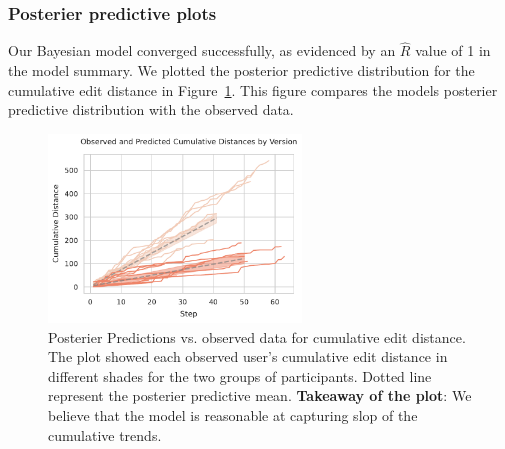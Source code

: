 \subsubsection{Posterier predictive plots}
Our Bayesian model converged successfully, as evidenced by an $\hat{R}$ value of 1 in the model summary. We plotted the posterior predictive distribution for the cumulative edit distance in Figure~\ref{fig:observed_and_predicted_cumulative_distances_by_version_m3}. This figure compares the models posterier predictive distribution with the observed data.

\begin{figure}[h!]
    \centering
    \includegraphics[width=0.6\textwidth]{content/image/distance/observed_and_predicted_cumulative_distances_by_version_m3.pdf}
    \caption{Posterier Predictions vs. observed data for cumulative edit distance. The plot showed each observed user's cumulative edit distance in different shades for the two groups of participants. Dotted line represent the posterier predictive mean. \textbf{Takeaway of the plot}: We believe that the model is reasonable at capturing slop of the cumulative trends.}
    \label{fig:observed_and_predicted_cumulative_distances_by_version_m3}
\end{figure}
